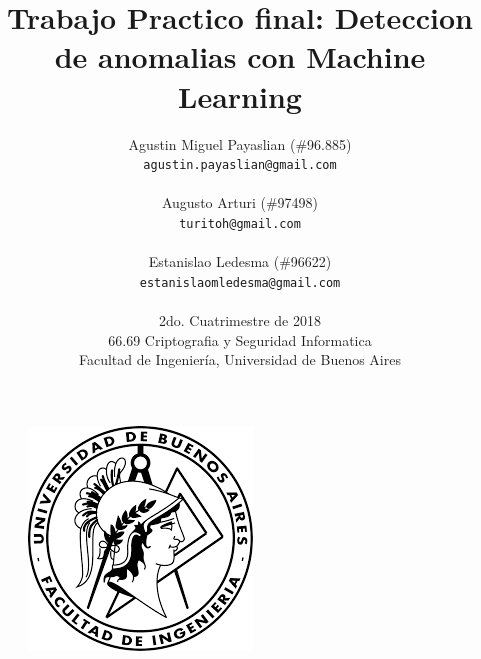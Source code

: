 \documentclass[a4paper,10pt]{article}
\begin{document}
\pagestyle{fancy}
\fancyhf{}

\fancyfoot[R]{\thepage}


\title{\textbf{Trabajo Practico final: Deteccion de anomalias con Machine Learning}}



\author{Agustin Miguel Payaslian (\#96.885)\\
\texttt{agustin.payaslian@gmail.com}\\
\\
Augusto Arturi (\#97498)\\
\texttt{turitoh@gmail.com}\\
\\
Estanislao Ledesma (\#96622)\\
\texttt{estanislaomledesma@gmail.com}\\
\\
\vspace{5mm}
\normalsize{2do. Cuatrimestre de 2018}\\
\vspace{5mm}
\normalsize{66.69 Criptografia y Seguridad Informatica}\\
\vspace{5mm}
\normalsize{Facultad de Ingeniería, Universidad de Buenos Aires}\\
}
\date{}


\maketitle

\vspace{5mm}
\begin{figure}[!htp]
\centering
\includegraphics[scale=1]{Logo.png} 
\end{figure}
\vspace{5mm}
\end{document}
